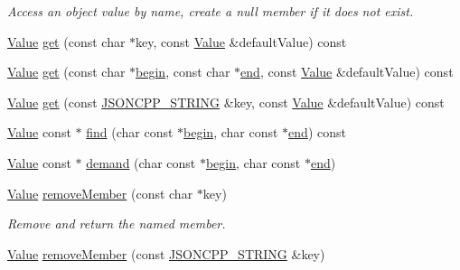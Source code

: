 \begin{DoxyCompactItemize}
\begin{DoxyCompactList}\small\item\em Access an object value by name, create a null member if it does not exist. \end{DoxyCompactList}\item 
\hyperlink{class_json_1_1_value}{Value} \hyperlink{class_json_1_1_value_a57de86629ed23246f14014fb6c44fa67}{get} (const char $\ast$key, const \hyperlink{class_json_1_1_value}{Value} \&default\+Value) const
\item 
\hyperlink{class_json_1_1_value}{Value} \hyperlink{class_json_1_1_value_aa59ed050e87e1d58d93671a38687f36c}{get} (const char $\ast$\hyperlink{class_json_1_1_value_a015459a3950c198d63a2d3be8f5ae296}{begin}, const char $\ast$\hyperlink{class_json_1_1_value_a3e443cd0ef24f7e028b175e47ee045e0}{end}, const \hyperlink{class_json_1_1_value}{Value} \&default\+Value) const
\item 
\hyperlink{class_json_1_1_value}{Value} \hyperlink{class_json_1_1_value_a7406e6af727c288bf8ab59945ece686a}{get} (const \hyperlink{config_8h_a1e723f95759de062585bc4a8fd3fa4be}{J\+S\+O\+N\+C\+P\+P\+\_\+\+S\+T\+R\+I\+NG} \&key, const \hyperlink{class_json_1_1_value}{Value} \&default\+Value) const
\item 
\hyperlink{class_json_1_1_value}{Value} const  $\ast$ \hyperlink{class_json_1_1_value_a111101d212bf787bbe515388d726a175}{find} (char const $\ast$\hyperlink{class_json_1_1_value_a015459a3950c198d63a2d3be8f5ae296}{begin}, char const $\ast$\hyperlink{class_json_1_1_value_a3e443cd0ef24f7e028b175e47ee045e0}{end}) const
\item 
\hyperlink{class_json_1_1_value}{Value} const  $\ast$ \hyperlink{class_json_1_1_value_afeb7ff596a0929d90c5f2f3cffb413ed}{demand} (char const $\ast$\hyperlink{class_json_1_1_value_a015459a3950c198d63a2d3be8f5ae296}{begin}, char const $\ast$\hyperlink{class_json_1_1_value_a3e443cd0ef24f7e028b175e47ee045e0}{end})
\item 
\hyperlink{class_json_1_1_value}{Value} \hyperlink{class_json_1_1_value_aa52f7873b95d29627d6e83ba96f69aaa}{remove\+Member} (const char $\ast$key)
\begin{DoxyCompactList}\small\item\em Remove and return the named member. \end{DoxyCompactList}\item 
\hyperlink{class_json_1_1_value}{Value} \hyperlink{class_json_1_1_value_a1dfd5d30fbc53fcd9c4955b8b3e7885c}{remove\+Member} (const \hyperlink{config_8h_a1e723f95759de062585bc4a8fd3fa4be}{J\+S\+O\+N\+C\+P\+P\+\_\+\+S\+T\+R\+I\+NG} \&key)

\end{DoxyCompactItemize}
